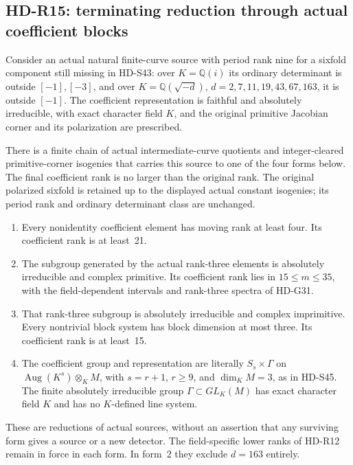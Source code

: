\subsection{HD-R15: terminating reduction through actual coefficient blocks}
\label{sec:rank-three-source-reduction}

Consider an actual natural finite-curve source with period
rank nine for a sixfold component still missing in HD-S43:
over \(K=\mathbb Q(i)\) its ordinary determinant is outside
\([-1],[-3]\), and over
\(K=\mathbb Q(\sqrt{-d})\), \(d=2,7,11,19,43,67,163\),
it is outside \([-1]\). The coefficient representation is
faithful and absolutely irreducible, with exact character
field \(K\), and the original primitive Jacobian corner
and its polarization are prescribed.

There is a finite chain of actual intermediate-curve
quotients and integer-cleared primitive-corner isogenies
that carries this source to one of the four forms below.
The final coefficient rank is no larger than the original
rank. The original polarized sixfold is retained up to the
displayed actual constant isogenies; its period rank and
ordinary determinant class are unchanged.
\begin{enumerate}
\item Every nonidentity coefficient element has moving
rank at least four. Its coefficient rank is at least~21.
\item The subgroup generated by the actual rank-three
elements is absolutely irreducible and complex primitive.
Its coefficient rank lies in \(15\le m\le35\), with the
field-dependent intervals and rank-three spectra of HD-G31.
\item That rank-three subgroup is absolutely irreducible
and complex imprimitive. Every nontrivial block system
has block dimension at most three. Its coefficient rank
is at least~15.
\item The coefficient group and representation are
literally \(S_s\times\Gamma\) on
\(\operatorname{Aug}(K^s)\otimes_K M\), with
\(s=r+1\), \(r\ge9\), and \(\dim_KM=3\), as in
HD-S45. The finite absolutely irreducible group
\(\Gamma\subset GL_K(M)\) has exact character field
\(K\) and has no \(K\)-defined line system.
\end{enumerate}
These are reductions of actual sources, without an assertion
that any surviving form gives a source or a new detector.
The field-specific lower ranks of HD-R12 remain in force
in each form. In form~2 they exclude \(d=163\) entirely.

